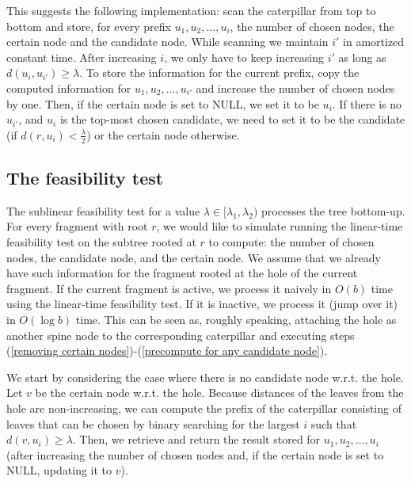 \documentclass[a4paper,UKenglish]{lipics-v2016}
\newcounter{mycounter}
\newenvironment{noindlist}
 {\begin{list}{\arabic{mycounter}.~~}{\usecounter{mycounter} \labelsep=0em \labelwidth=0em \leftmargin=0em \itemindent=0em}}
 {\end{list}}
\theoremstyle{plain}
\begin{document}
\begin{noindlist}
This suggests the following implementation: scan the caterpillar from top to bottom and store, for every prefix $u_{1},u_{2},\ldots,u_{i}$,
the number of chosen nodes, the certain node and the candidate node. While scanning we maintain $i'$ in amortized constant time.
After increasing $i$, we only have to keep increasing $i'$ as long as $d(u_{i},u_{i'}) \ge \lambda$.
To store the information for the current prefix, copy the computed information for $u_{1},u_{2},\ldots,u_{i'}$
and increase the number of chosen nodes by one. Then, if the certain node is set to NULL, we set it to be $u_{i}$. If there is no $u_{i'}$, and $u_i$ is the top-most chosen candidate, we need to set it to be the candidate (if $d(r,u_i) < \frac{\lambda}{2}$) or the certain node otherwise.
\end{noindlist}

\subsection{The feasibility test}
\label{sec:feasibility test}

The sublinear feasibility test for a value $\lambda \in [\lambda_1,\lambda_2)$ processes the tree bottom-up. For every fragment with root $r$, we would like to simulate running the
linear-time feasibility test on the subtree rooted at $r$ to compute: the number of chosen nodes, the candidate node, and the certain
node. We assume that we already have such information for the fragment rooted at the hole of the current fragment.
If the current fragment is active, we process it naively in $O(b)$ time
using the linear-time feasibility test. If it is inactive, we process it (jump over it) in $O(\log b)$ time.
This can be seen as, roughly speaking, attaching the hole as another spine node to the corresponding caterpillar and executing steps
(\ref{removing certain nodes})-(\ref{precompute for any candidate node}).

We start by considering the case where there is no candidate node w.r.t. the hole. Let $v$ be the certain node w.r.t. the hole.
Because distances of the leaves from the hole are non-increasing,  we can compute the prefix of the caterpillar consisting of
leaves that can be chosen by binary searching for the largest $i$ such that $d(v,u_{i})\geq \lambda$. Then, we retrieve and return the result
stored for $u_{1},u_{2},\ldots,u_{i}$ (after increasing the number of chosen nodes and, if the certain node is set to NULL, updating it to $v$).
\end{document}
